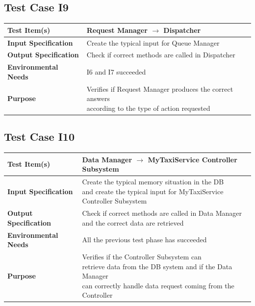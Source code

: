 \documentclass[11pt,titlepage]{article} %
\begin{document}
  \subsection{Test Case I9}
  \begin{table}[H]
    \begin{tabular*}{16cm}{ll}
	\hline
	\textbf{Test Item(s)} & Request Manager $ \longrightarrow $ Dispatcher \\
	\hline
	\textbf{Input Specification} & Create the typical input for Queue Manager \\
	\hline
	\textbf{Output Specification} & Check if correct methods are called in Dispatcher \\
	\hline
	\textbf{Environmental Needs} & I6 and I7 succeeded\\
	\hline
	\textbf{Purpose} & \pbox{20cm}{Verifies if Request Manager produces the correct answers \\ according to the type of action requested} \\
	\hline
    \end{tabular*}
  \end{table}
  
  \subsection{Test Case I10}
  \begin{table}[ht!]
    \begin{tabular*}{16cm}{ll}
	\hline
	\textbf{Test Item(s)} & Data Manager $ \longrightarrow $ MyTaxiService Controller Subsystem \\
	\hline
	\textbf{Input Specification} & \pbox{20cm}{Create the typical memory situation in the DB \\ and create the typical input for MyTaxiService Controller Subsystem} \\
	\hline
	\textbf{Output Specification} & \pbox{20cm}{Check if correct methods are called in Data Manager \\ and the correct data are retrieved} \\
	\hline
	\textbf{Environmental Needs} & All the previous test phase has succeeded\\
	\hline
	\textbf{Purpose} & \pbox{20cm}{Verifies if the Controller Subsystem can \\ retrieve data from the DB system and if the Data Manager \\ can correctly handle data request coming from the Controller} \\
	\hline
    \end{tabular*}
  \end{table}
  
\end{document}
